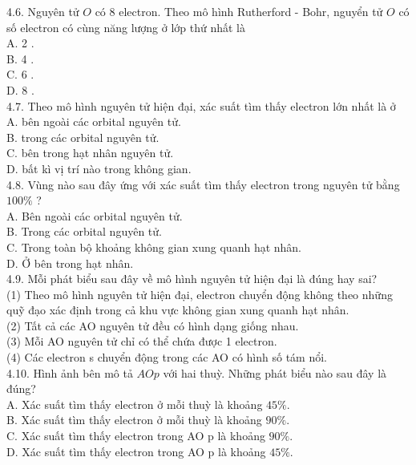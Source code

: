 \documentclass[10pt]{article}
\begin{document}
4.6. Nguyên tử $O$ có 8 electron. Theo mô hình Rutherford - Bohr, nguyển tử $O$ có số electron có cùng năng lượng ở lớp thứ nhất là\\
A. 2 .\\
B. 4 .\\
C. 6 .\\
D. 8 .\\
4.7. Theo mô hình nguyên tử hiện đại, xác suất tìm thấy electron lớn nhất là ở\\
A. bên ngoài các orbital nguyên tử.\\
B. trong các orbital nguyên tử.\\
C. bên trong hạt nhân nguyên tử.\\
D. bất kì vị trí nào trong không gian.\\
4.8. Vùng nào sau đây ứng với xác suất tìm thấy electron trong nguyên tử bằng $100 \%$ ?\\
A. Bên ngoài các orbital nguyên tử.\\
B. Trong các orbital nguyên tử.\\
C. Trong toàn bộ khoảng không gian xung quanh hạt nhân.\\
D. Ở bên trong hạt nhân.\\
4.9. Mỗi phát biểu sau đây về mô hình nguyên tử hiện đại là đúng hay sai?\\
(1) Theo mô hình nguyên tử hiện đại, electron chuyển động không theo những quỹ đạo xác định trong cả khu vực không gian xung quanh hạt nhân.\\
(2) Tất cả các AO nguyên tử đều có hình dạng giống nhau.\\
(3) Mỗi AO nguyên tử chỉ có thể chứa được 1 electron.\\
(4) Các electron s chuyển động trong các AO có hình số tám nổi.\\
4.10. Hình ảnh bên mô tả $A O p$ với hai thuỳ. Những phát biểu nào sau đây là đúng?\\
A. Xác suất tìm thấy electron ở mỗi thuỳ là khoảng $45 \%$.\\
B. Xác suất tìm thấy electron ở mỗi thuỳ là khoảng $90 \%$.\\
C. Xác suất tìm thấy electron trong AO p là khoảng $90 \%$.\\
D. Xác suất tìm thấy electron trong AO p là khoảng $45 \%$.
\end{document}

